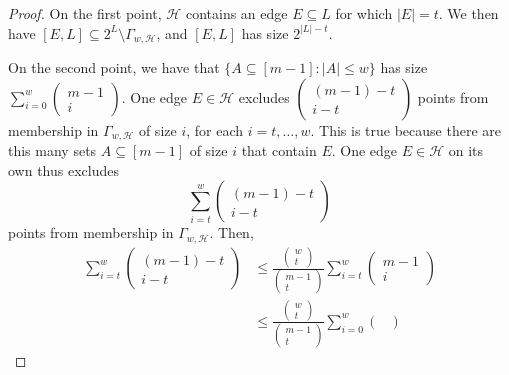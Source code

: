 \documentclass{article}
\begin{document}
\begin{proof}
    On the first point, $\mathcal{H}$ contains an edge $E \subseteq L$ for which $|E| = t$. We then have $[E,L] \subseteq 2^L \setminus \Gamma_{w,\mathcal{H}}$, and $[E,L]$ has size $2^{|L|-t}$.

    On the second point, we have that $\{A \subseteq [m-1]: |A| \leq w\}$ has size $\sum_{i=0}^w\left(\begin{smallmatrix}m-1\\i\end{smallmatrix}\right)$. One edge $E \in \mathcal{H}$ excludes $\left(\begin{smallmatrix}(m-1)-t\\i-t\end{smallmatrix}\right)$ points from membership in $\Gamma_{w,\mathcal{H}}$ of size $i$, for each $i = t, \ldots, w$. This is true because there are this many sets $A\subseteq [m-1]$ of size $i$ that contain $E$. One edge $E \in \mathcal{H}$ on its own thus excludes
    \begin{equation}
        \sum_{i=t}^w\begin{pmatrix}
            (m-1)-t\\i-t
        \end{pmatrix}
    \end{equation}
    points from membership in $\Gamma_{w,\mathcal{H}}$. Then,
    \begin{align}
        \sum_{i=t}^w\begin{pmatrix}
            (m-1)-t\\i-t
        \end{pmatrix}&\leq\frac{\begin{pmatrix}
            w\\t
        \end{pmatrix}}{\begin{pmatrix}
            m-1\\t
        \end{pmatrix}}\sum_{i=t}^w\begin{pmatrix}
            m-1\\i
        \end{pmatrix}\\
        &\leq \frac{\begin{pmatrix}
            w\\t
        \end{pmatrix}}{\begin{pmatrix}
            m-1\\t
        \end{pmatrix}}\sum_{i=0}^w\begin{pmatrix}

\end{pmatrix}
\end{align}
\end{proof}
\end{document}
